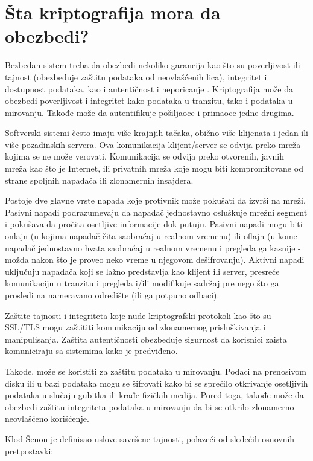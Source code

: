 \documentclass[a4paper]{article}
\begin{document}
\section{Šta kriptografija mora da obezbedi?}
\label{sec:šta_kriptografija_mora_da_obezbedi}
Bezbedan sistem treba da obezbedi nekoliko garancija kao što su poverljivost ili tajnost (obezbeđuje zaštitu podataka od neovlašćenih lica), integritet i dostupnost podataka, kao i autentičnost i neporicanje \cite{synopsys}. Kriptografija može da obezbedi poverljivost i integritet kako podataka u tranzitu, tako i podataka u mirovanju. Takođe može da autentifikuje pošiljaoce i primaoce jedne drugima.

Softverski sistemi često imaju više krajnjih tačaka, obično više klijenata i jedan ili više pozadinskih servera. Ova komunikacija klijent/server se odvija preko mreža kojima se ne može verovati. Komunikacija se odvija preko otvorenih, javnih mreža kao što je Internet, ili privatnih mreža koje mogu biti kompromitovane od strane spoljnih napadača ili zlonamernih insajdera.

 Postoje dve glavne vrste napada koje protivnik može pokušati da izvrši na mreži. Pasivni napadi podrazumevaju da napadač jednostavno osluškuje mrežni segment i pokušava da pročita osetljive informacije dok putuju. Pasivni napadi mogu biti onlajn (u kojima napadač čita saobraćaj u realnom vremenu) ili oflajn (u kome napadač jednostavno hvata saobraćaj u realnom vremenu i pregleda ga kasnije - možda nakon što je proveo neko vreme u njegovom dešifrovanju). Aktivni napadi uključuju napadača koji se lažno predstavlja kao klijent ili server, presreće komunikaciju u tranzitu i pregleda i/ili modifikuje sadržaj pre nego što ga prosledi na nameravano odredište (ili ga potpuno odbaci).

Zaštite tajnosti i integriteta koje nude kriptografski protokoli kao što su SSL/TLS mogu zaštititi komunikaciju od zlonamernog prisluškivanja i manipulisanja. Zaštita autentičnosti obezbeđuje sigurnost da korisnici zaista komuniciraju sa sistemima kako je predviđeno.

Takođe, može se koristiti za zaštitu podataka u mirovanju. Podaci na prenosivom disku ili u bazi podataka mogu se šifrovati kako bi se sprečilo otkrivanje osetljivih podataka u slučaju gubitka ili krađe fizičkih medija. Pored toga, takođe može da obezbedi zaštitu integriteta podataka u mirovanju da bi se otkrilo zlonamerno neovlašćeno korišćenje.

Klod Šenon je definisao uslove savršene tajnosti, polazeći od sledećih osnovnih pretpostavki:
\end{document}
